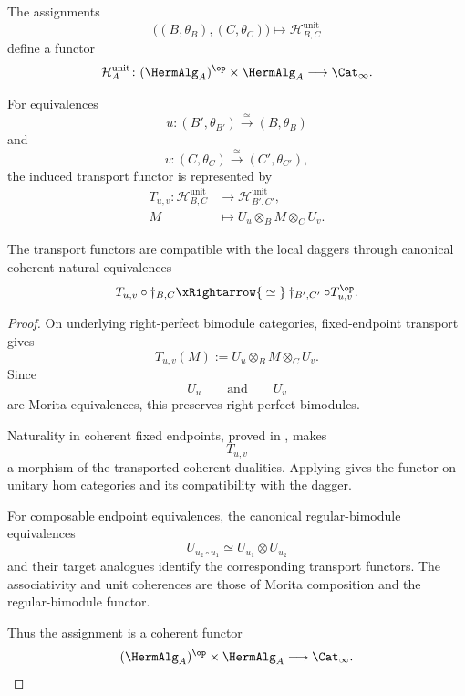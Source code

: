 \begin{proposition}
\label{prop:unitary-hom-category-functor}
The assignments
\[
    \bigl(
        (B,\theta_B),
        (C,\theta_C)
    \bigr)
    \longmapsto
    \mathcal H^{\mathrm{unit}}_{B,C}
\]
define a functor
\[
    \mathcal H_A^{\mathrm{unit}}
    \colon
    (\HermAlg_A)^{\op}
    \times
    \HermAlg_A
    \longrightarrow
    \Cat_\infty.
\]

For equivalences
\[
    u
    \colon
    (B',\theta_{B'})
    \xrightarrow{\;\simeq\;}
    (B,\theta_B)
\]
and
\[
    v
    \colon
    (C,\theta_C)
    \xrightarrow{\;\simeq\;}
    (C',\theta_{C'}),
\]
the induced transport functor is represented by
\[
\begin{aligned}
    T_{u,v}
    \colon
    \mathcal H^{\mathrm{unit}}_{B,C}
    &\longrightarrow
    \mathcal H^{\mathrm{unit}}_{B',C'},
    \\
    M
    &\longmapsto
    U_u\otimes_BM\otimes_CU_v.
\end{aligned}
\]

The transport functors are compatible with the local daggers through
canonical coherent natural equivalences
\[
    T_{u,v}\circ\dagger_{B,C}
    \xRightarrow{\;\simeq\;}
    \dagger_{B',C'}
    \circ
    T_{u,v}^{\op}.
\]
\end{proposition}

\begin{proof}
On underlying right-perfect bimodule categories, fixed-endpoint
transport gives
\[
    T_{u,v}(M)
    :=
    U_u\otimes_BM\otimes_CU_v.
\]
Since
\[
    U_u
    \qquad\text{and}\qquad
    U_v
\]
are Morita equivalences, this preserves right-perfect bimodules.

Naturality in coherent fixed endpoints, proved in
,
makes
\[
    T_{u,v}
\]
a morphism of the transported coherent dualities. Applying
gives the functor on unitary hom categories and its compatibility with
the dagger.

For composable endpoint equivalences, the canonical regular-bimodule
equivalences
\[
    U_{u_2\circ u_1}
    \simeq
    U_{u_1}\otimes U_{u_2}
\]
and their target analogues identify the corresponding transport
functors. The associativity and unit coherences are those of Morita
composition and the regular-bimodule functor.

Thus the assignment is a coherent functor
\[
    (\HermAlg_A)^{\op}
    \times
    \HermAlg_A
    \longrightarrow
    \Cat_\infty.
\]
\end{proof}

